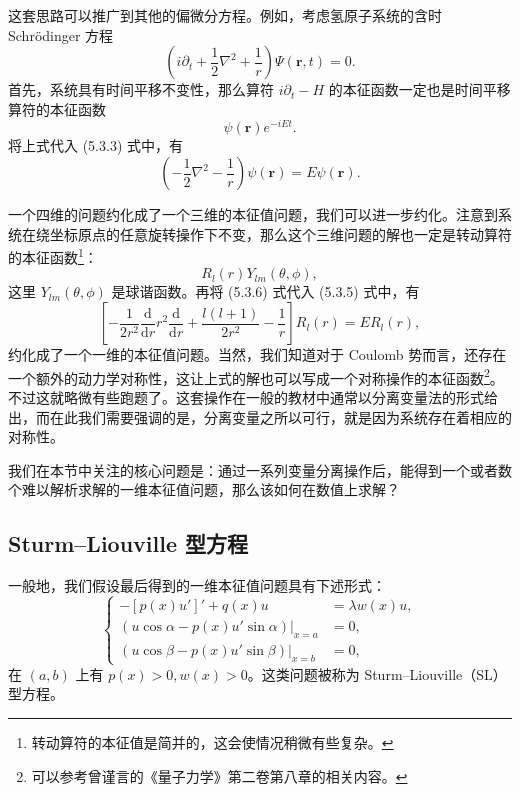 这套思路可以推广到其他的偏微分方程。例如，考虑氢原子系统的含时 Schrödinger 方程
\begin{equation}
\left(i\partial_t+\frac12\nabla^2+\frac1r\right)\Psi(\bm r,t)=0.
\tag{5.3.3}
\end{equation}
首先，系统具有时间平移不变性，那么算符 $i\partial_t-H$ 的本征函数一定也是时间平移算符的本征函数
\begin{equation}
\psi(\bm r)e^{-iEt}.
\tag{5.3.4}
\end{equation}
将上式代入 (5.3.3) 式中，有
\begin{equation}
\left(-\frac12\nabla^2-\frac1r\right)\psi(\bm r)=E\psi(\bm r).
\tag{5.3.5}
\end{equation}

一个四维的问题约化成了一个三维的本征值问题，我们可以进一步约化。注意到系统在绕坐标原点的任意旋转操作下不变，那么这个三维问题的解也一定是转动算符的本征函数\footnote{转动算符的本征值是简并的，这会使情况稍微有些复杂。}：
\begin{equation}
R_l(r)Y_{lm}(\theta,\phi),
\tag{5.3.6}
\end{equation}
这里 $Y_{lm}(\theta,\phi)$ 是球谐函数。再将 (5.3.6) 式代入 (5.3.5) 式中，有
\begin{equation}
\left[-\frac1{2r^2}\frac{\mathrm d}{\mathrm dr}r^2\frac{\mathrm d}{\mathrm dr}
+\frac{l(l+1)}{2r^2}-\frac1r\right]R_l(r)=ER_l(r),
\tag{5.3.7}
\end{equation}
约化成了一个一维的本征值问题。当然，我们知道对于 Coulomb 势而言，还存在一个额外的动力学对称性，这让上式的解也可以写成一个对称操作的本征函数\footnote{可以参考曾谨言的《量子力学》第二卷第八章的相关内容。}。不过这就略微有些跑题了。这套操作在一般的教材中通常以分离变量法的形式给出，而在此我们需要强调的是，分离变量之所以可行，就是因为系统存在着相应的对称性。

我们在本节中关注的核心问题是：通过一系列变量分离操作后，能得到一个或者数个难以解析求解的一维本征值问题，那么该如何在数值上求解？

\subsection{Sturm--Liouville 型方程}

一般地，我们假设最后得到的一维本征值问题具有下述形式：
\begin{equation}
\left\{
\begin{aligned}
-[p(x)u']'+q(x)u&=\lambda w(x)u,\\
\left.(u\cos\alpha-p(x)u'\sin\alpha)\right|_{x=a}&=0,\\
\left.(u\cos\beta-p(x)u'\sin\beta)\right|_{x=b}&=0,
\end{aligned}\right.
\tag{5.3.8}
\end{equation}
在 $(a,b)$ 上有 $p(x)>0,w(x)>0$。这类问题被称为 Sturm--Liouville（SL）型方程。

